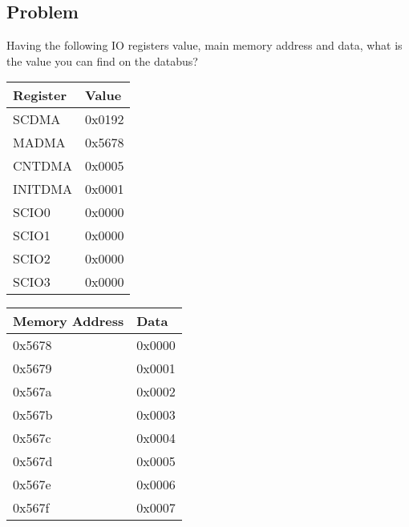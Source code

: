 

\subsection*{Problem}
Having the following IO registers value, main memory address
and data, what is the value you can find on the databus?

\begin{table}[H]
    \centering
    \begin{tabular}{|l|l|}
        \hline
        \textbf{Register} & \textbf{Value} \\ \hline
        SCDMA & 0x0192 \\ \hline
        MADMA & 0x5678 \\ \hline
        CNTDMA & 0x0005 \\ \hline
        INITDMA & 0x0001 \\ \hline
        SCIO0 & 0x0000 \\ \hline
        SCIO1 & 0x0000 \\ \hline
        SCIO2 & 0x0000 \\ \hline
        SCIO3 & 0x0000 \\ \hline
    \end{tabular}
    \begin{tabular}{|l|l|}
        \hline
        \textbf{Memory Address} & \textbf{Data} \\ \hline
        0x5678 & 0x0000 \\ \hline
        0x5679 & 0x0001 \\ \hline
        0x567a & 0x0002 \\ \hline
        0x567b & 0x0003 \\ \hline
        0x567c & 0x0004 \\ \hline
        0x567d & 0x0005 \\ \hline
        0x567e & 0x0006 \\ \hline
        0x567f & 0x0007 \\ \hline
    \end{tabular}
\end{table}

